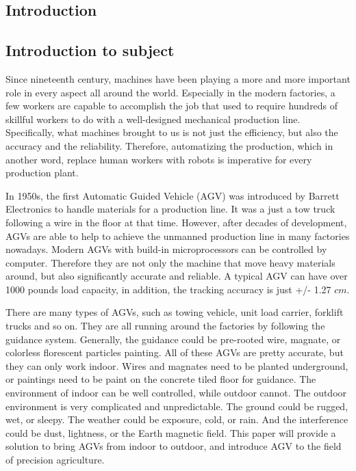 \documentclass[12pt]{article}
\begin{document}
\begin{flushleft}

\section{Introduction}

\subsection{Introduction to subject}

Since nineteenth century, machines have been playing a more and more important role in every aspect all around the world. Especially in the modern factories, a few workers are capable to accomplish the job that used to require hundreds of skillful workers to do with a well-designed mechanical production line. %
Specifically, what machines brought to us is not just the efficiency, but also the accuracy and the reliability. Therefore, automatizing the production, which in another word, replace human workers with robots is imperative for every production plant. 

In 1950s, the first Automatic Guided Vehicle (AGV) was introduced by Barrett Electronics to handle materials for a production line. \cite{olmi2011traffic} It was a just a tow truck following a wire in the floor at that time. However, after decades of development, AGVs are able to help to achieve the unmanned production line in many factories nowadays. Modern AGVs with build-in microprocessors can be controlled by computer. Therefore they are not only the machine that move heavy materials around, but also significantly accurate and reliable. A typical AGV can have over 1000 pounds load capacity, in addition, the tracking accuracy is just +/- 1.27 $cm$. \cite{KESH} 

There are many types of AGVs, such as towing vehicle, unit load carrier, forklift trucks and so on. They are all running around the factories by following the guidance system. Generally, the guidance could be pre-rooted wire, magnate, or colorless florescent particles painting. All of these AGVs are pretty accurate, but they can only work indoor. Wires and magnates need to be planted underground, or paintings need to be paint on the concrete tiled floor for guidance. The environment of indoor can be well controlled, while outdoor cannot. The outdoor environment is very complicated and unpredictable. The ground could be rugged, wet, or sleepy. The weather could be exposure, cold, or rain. And the interference could be dust, lightness, or the Earth magnetic field. This paper will provide a solution to bring AGVs from indoor to outdoor, and introduce AGV to the field of precision agriculture.


\end{flushleft}
\end{document}
